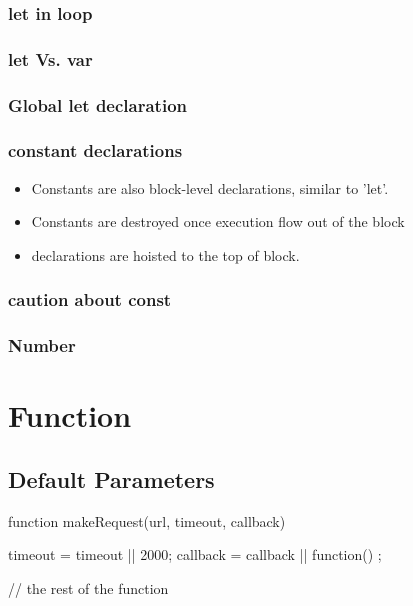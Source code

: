 \subsubsection{let in loop}

\subsubsection{let Vs. var}

\subsubsection{Global let declaration}

\subsubsection{constant declarations}
\begin{itemize}
\item Constants are also block-level declarations, similar to 'let'.
\item Constants are destroyed once execution flow out of the block
\item declarations are hoisted to the top of block.
\end{itemize}

\subsubsection{caution about const}

\subsubsection{Number}


\section{Function}


\subsection{Default Parameters}

\begin{JavaScript}
function makeRequest(url, timeout, callback) {

    timeout = timeout || 2000;
    callback = callback || function() {};

    // the rest of the function

}
\end{JavaScript}

